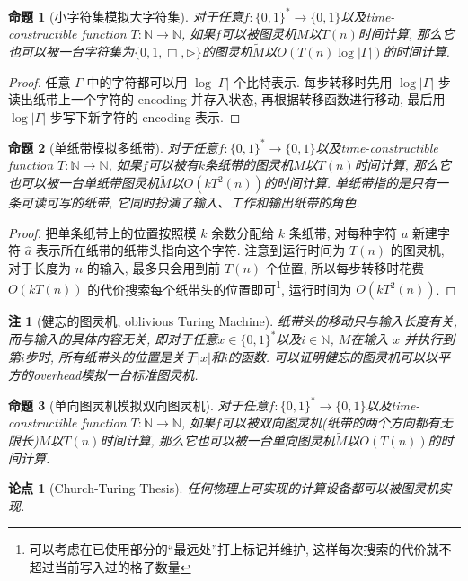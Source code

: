 \documentclass[8pt]{article}
\theoremstyle{compact}
\newtheorem{proposition}{命题}[section]
\newtheorem{remark}{注}[section]
\newtheorem{thesis}{论点}[section]
\begin{document}
\begin{proposition}[小字符集模拟大字符集]
	对于任意$f: \{0, 1\}^* \to \{0, 1\}$以及time-constructible function $T: \mathbb{N} \to \mathbb{N}$, 如果$f$可以被图灵机$M$以$T(n)$时间计算, 那么它也可以被一台字符集为$\{0, 1, \Box, \triangleright\}$的图灵机$\tilde{M}$以$O(T(n)\log |\Gamma|)$的时间计算. 
\end{proposition}
\begin{proof}
	任意 $\Gamma$ 中的字符都可以用 $\log |\Gamma|$ 个比特表示. 每步转移时先用 $\log |\Gamma|$ 步读出纸带上一个字符的 encoding 并存入状态, 再根据转移函数进行移动, 最后用 $\log |\Gamma|$ 步写下新字符的 encoding 表示.
\end{proof}
\begin{proposition}[单纸带模拟多纸带]
	对于任意$f: \{0, 1\}^* \to \{0, 1\}$以及time-constructible function $T: \mathbb{N} \to \mathbb{N}$, 如果$f$可以被有$k$条纸带的图灵机$M$以$T(n)$时间计算, 那么它也可以被一台单纸带图灵机$\tilde{M}$以$O(kT^2(n))$的时间计算. 单纸带指的是只有一条可读可写的纸带, 它同时扮演了输入、工作和输出纸带的角色. 
\end{proposition}
\begin{proof}
	把单条纸带上的位置按照模 $k$ 余数分配给 $k$ 条纸带, 对每种字符 $a$ 新建字符 $\hat a$ 表示所在纸带的纸带头指向这个字符. 注意到运行时间为 $T(n)$ 的图灵机, 对于长度为 $n$ 的输入, 最多只会用到前 $T(n)$ 个位置, 所以每步转移时花费 $O(kT(n))$ 的代价搜索每个纸带头的位置即可\footnote{可以考虑在已使用部分的“最远处”打上标记并维护, 这样每次搜索的代价就不超过当前写入过的格子数量}, 运行时间为 $O(kT^2(n))$.
\end{proof}
\begin{remark}[健忘的图灵机, oblivious Turing Machine]
	纸带头的移动只与输入长度有关, 而与输入的具体内容无关, 即对于任意$x \in \{0, 1\}^*$以及$i \in \mathbb N$, $M$在输入 $x$ 并执行到第$i$步时, 所有纸带头的位置是关于$|x|$和$i$的函数. 可以证明健忘的图灵机可以以平方的overhead模拟一台标准图灵机. 
	\label{oblivious}
\end{remark}
\begin{proposition}[单向图灵机模拟双向图灵机]
	对于任意$f: \{0, 1\}^* \to \{0, 1\}$以及time-constructible function $T: \mathbb{N} \to \mathbb{N}$, 如果$f$可以被双向图灵机(纸带的两个方向都有无限长)$M$以$T(n)$时间计算, 那么它也可以被一台单向图灵机$\tilde{M}$以$O(T(n))$的时间计算. 
\end{proposition}
\begin{thesis}[Church-Turing Thesis]
	任何物理上可实现的计算设备都可以被图灵机实现. 
\end{thesis}
\end{document}
